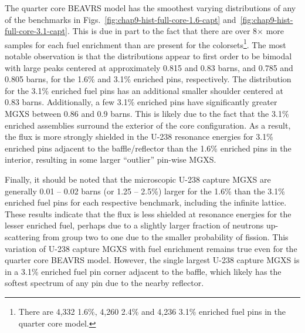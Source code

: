 The quarter core \ac{BEAVRS} model has the smoothest varying distributions of any of the benchmarks in Figs.~\ref{fig:chap9-hist-full-core-1.6-capt} and~\ref{fig:chap9-hist-full-core-3.1-capt}. This is due in part to the fact that there are over 8$\times$ more samples for each fuel enrichment than are present for the colorsets\footnote{There are 4,332 1.6\%, 4,260 2.4\% and 4,236 3.1\% enriched fuel pins in the quarter core model.}. The most notable observation is that the distributions appear to first order to be bimodal with large peaks centered at approximately 0.815 and 0.83 barns, and 0.785 and 0.805 barns, for the 1.6\% and 3.1\% enriched pins, respectively. The distribution for the 3.1\% enriched fuel pins has an additional smaller shoulder centered at 0.83 barns. Additionally, a few 3.1\% enriched pins have significantly greater \ac{MGXS} between 0.86 and 0.9 barns. This is likely due to the fact that the 3.1\% enriched assemblies surround the exterior of the core configuration. As a result, the flux is more strongly shielded in the U-238 resonance energies for 3.1\% enriched pins adjacent to the baffle/reflector than the 1.6\% enriched pins in the interior, resulting in some larger ``outlier'' pin-wise \ac{MGXS}.

Finally, it should be noted that the microscopic U-238 capture \ac{MGXS} are generally 0.01 -- 0.02 barns (or 1.25 -- 2.5\%) larger for the 1.6\% than the 3.1\% enriched fuel pins for each respective benchmark, including the infinite lattice. These results indicate that the flux is less shielded at resonance energies for the lesser enriched fuel, perhaps due to a slightly larger fraction of neutrons up-scattering from group two to one due to the smaller probability of fission. This variation of U-238 capture \ac{MGXS} with fuel enrichment remains true even for the quarter core \ac{BEAVRS} model. However, the single largest U-238 capture \ac{MGXS} is in a 3.1\% enriched fuel pin corner adjacent to the baffle, which likely has the softest spectrum of any pin due to the nearby reflector.




